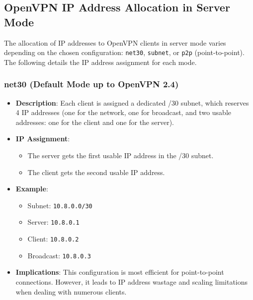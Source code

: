 \subsection{OpenVPN IP Address Allocation in Server Mode}

The allocation of IP addresses to OpenVPN clients in server mode varies depending on the chosen configuration: \texttt{net30}, \texttt{subnet}, or \texttt{p2p} (point-to-point). The following details the IP address assignment for each mode.

\subsubsection{net30 (Default Mode up to OpenVPN 2.4)}
\begin{itemize}
    \item \textbf{Description}: Each client is assigned a dedicated /30 subnet, which reserves 4 IP addresses (one for the network, one for broadcast, and two usable addresses: one for the client and one for the server).
\item \textbf{IP Assignment}:
\begin{itemize}
        \item The server gets the first usable IP address in the /30 subnet.
        \item The client gets the second usable IP address.
\end{itemize}
\item \textbf{Example}:
\begin{itemize}
\item Subnet: \texttt{10.8.0.0/30}
\item Server: \texttt{10.8.0.1}
\item Client: \texttt{10.8.0.2}
\item Broadcast: \texttt{10.8.0.3}
\end{itemize}
\item \textbf{Implications}: This configuration is most efficient for point-to-point connections. However, it leads to IP address wastage and scaling limitations when dealing with numerous clients.
\end{itemize}

